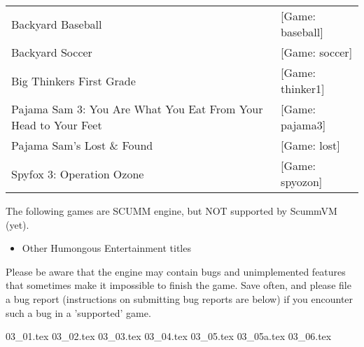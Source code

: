 \begin{itemize}
\begin{tabular}{ll}
  Backyard Baseball&                                             [Game: baseball]\\
  Backyard Soccer&                                               [Game: soccer]\\
  Big Thinkers First Grade&                                      [Game: thinker1]\\
  Pajama Sam 3: You Are What You Eat From Your Head to Your Feet&[Game: pajama3]\\
  Pajama Sam's Lost \& Found&                                    [Game: lost]\\
  Spyfox 3: Operation Ozone&                                     [Game: spyozon]\\
\end{tabular}

  The following games are SCUMM engine, but NOT supported by ScummVM (yet).
  \begin{itemize}
  \item Other Humongous Entertainment titles
  \end{itemize}
%
Please be aware that the engine may contain bugs and unimplemented features
that sometimes make it impossible to finish the game. Save often, and please
file a bug report (instructions on submitting bug reports are below) if you
encounter such a bug in a 'supported' game.
\end{itemize}
 {03_01.tex}
 {03_02.tex}
 {03_03.tex}
 {03_04.tex}
 {03_05.tex}
 {03_05a.tex}
 {03_06.tex}
